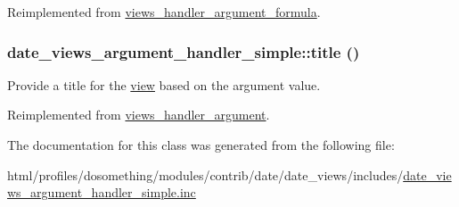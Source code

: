Reimplemented from \hyperlink{classviews__handler__argument__formula_a377fd11d178f88a0bd68c2ec9d6f9e00}{views\_\-handler\_\-argument\_\-formula}.\hypertarget{classdate__views__argument__handler__simple_a127ac9f2d1d7a45088719cfbbfbbdf93}{
\subsubsection[{title}]{\setlength{\rightskip}{0pt plus 5cm}date\_\-views\_\-argument\_\-handler\_\-simple::title ()}}
\label{classdate__views__argument__handler__simple_a127ac9f2d1d7a45088719cfbbfbbdf93}
Provide a title for the \hyperlink{classview}{view} based on the argument value. 

Reimplemented from \hyperlink{classviews__handler__argument_a76181ac24e7be4a09aaafc1fa5f15ea1}{views\_\-handler\_\-argument}.

The documentation for this class was generated from the following file:\begin{DoxyCompactItemize}
\item 
html/profiles/dosomething/modules/contrib/date/date\_\-views/includes/\hyperlink{date__views__argument__handler__simple_8inc}{date\_\-views\_\-argument\_\-handler\_\-simple.inc}\end{DoxyCompactItemize}
